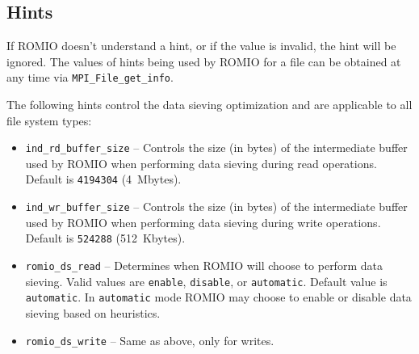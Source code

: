 \subsection{Hints}
\label{sec:hints}

If ROMIO doesn't understand a hint, or if the value is invalid, the hint
will be ignored. The values of hints being used by ROMIO for a file
can be obtained at any time via {\tt MPI\_File\_get\_info}.

The following hints control the data sieving optimization and are
applicable to all file system types:

\begin{itemize}
\item \texttt{ind\_rd\_buffer\_size} -- Controls the size (in bytes) of the
intermediate buffer used by ROMIO when performing data sieving during
read operations.  Default is \texttt{4194304} (4~Mbytes).
\item \texttt{ind\_wr\_buffer\_size} -- Controls the size (in bytes) of the
intermediate buffer used by ROMIO when performing data sieving during
write operations.  Default is \texttt{524288} (512~Kbytes).
\item \texttt{romio\_ds\_read} -- 
Determines when ROMIO will choose to perform data sieving.
Valid values are \texttt{enable}, \texttt{disable}, or \texttt{automatic}.
Default value is \texttt{automatic}.  In \texttt{automatic} mode ROMIO
may choose to enable or disable data sieving based on heuristics.
\item \texttt{romio\_ds\_write} -- Same as above, only for writes.
\end{itemize}


